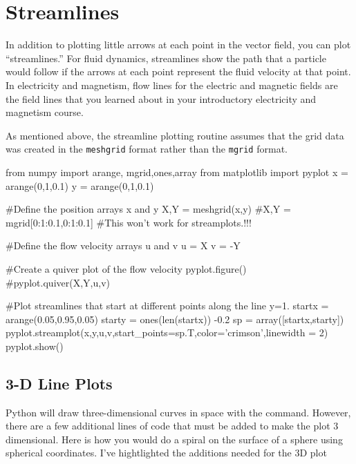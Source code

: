 \section{Streamlines}

In addition to plotting little arrows at each point in the vector field, you
can plot ``streamlines.'' For fluid dynamics, streamlines show the path that
a particle would follow if the arrows at each point represent the fluid
velocity at that point.  In electricity and magnetism, flow lines for the
electric and magnetic fields are the field lines that you learned about in
your introductory electricity and magnetism course.

As mentioned above, the streamline plotting routine assumes that the grid data
was created in the {\tt meshgrid} format rather than the {\tt mgrid} format.

\begin{codeexample}
\begin{VerbatimOut}{\listingFile}
from numpy import arange, mgrid,ones,array
from matplotlib import pyplot
x = arange(0,1,0.1)
y = arange(0,1,0.1)

#Define the position arrays x and y
X,Y = meshgrid(x,y)
#X,Y = mgrid[0:1:0.1,0:1:0.1]  #This won't work for streamplots.!!!

#Define the flow velocity arrays u and v
u = X
v = -Y

#Create a quiver plot of the flow velocity
pyplot.figure()
#pyplot.quiver(X,Y,u,v)

#Plot streamlines that start at different points along the line y=1.
startx = arange(0.05,0.95,0.05)
starty = ones(len(startx)) -0.2
sp = array([startx,starty])
pyplot.streamplot(x,y,u,v,start_points=sp.T,color='crimson',linewidth = 2)
pyplot.show()
\end{VerbatimOut}
\end{codeexample}

\subsection*{3-D Line Plots}
   Python will
draw three-dimensional curves in space with the  command.
However, there are a few additional lines of code that must be added
to make the plot 3 dimensional.  Here is how you would do a spiral on
the surface of a sphere using spherical coordinates.  I've
hightlighted the additions needed for the 3D plot

